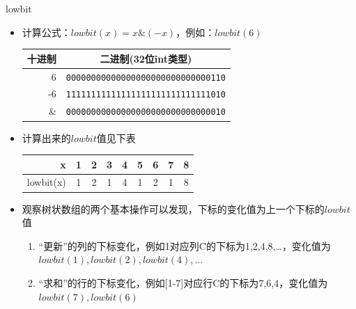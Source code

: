 \begin{frame}{lowbit}
    \begin{itemize}
        \item 计算公式：$lowbit(x)=x\&(-x)$，例如：$lowbit(6)$
        \begin{table}
            \begin{tabular}{r|c}
                十进制 & 二进制(32位int类型)                    \\\hline
                6   & \texttt{00000000000000000000000000000110} \\\hline
                -6  & \texttt{11111111111111111111111111111010}\\\hline
                \&  & \texttt{00000000000000000000000000000010} \\\hline
            \end{tabular}
        \end{table}
        \item 计算出来的$lowbit$值见下表
        \begin{table}
            \begin{tabular}{r|cccccccc}
                x         & 1    & 2    & 3    & 4    & 5    & 6    & 7    & 8 \\\hline
				lowbit(x) & 1    & 2    & 1    & 4    & 1    & 2    & 1    & 8 \\\hline
            \end{tabular}
        \end{table}
        \item 观察树状数组的两个基本操作可以发现，下标的变化值为上一个下标的$lowbit$值
        \begin{enumerate}[(1)]
            \item “更新”的列的下标变化，例如1对应列C的下标为{1,2,4,8,…}，变化值为$lowbit(1),lowbit(2),lowbit(4),\ldots$ 
            \item “求和”的行的下标变化，例如[1-7]对应行C的下标为{7,6,4}，变化值为$lowbit(7),lowbit(6)$            
        \end{enumerate}
    \end{itemize}
\end{frame}
